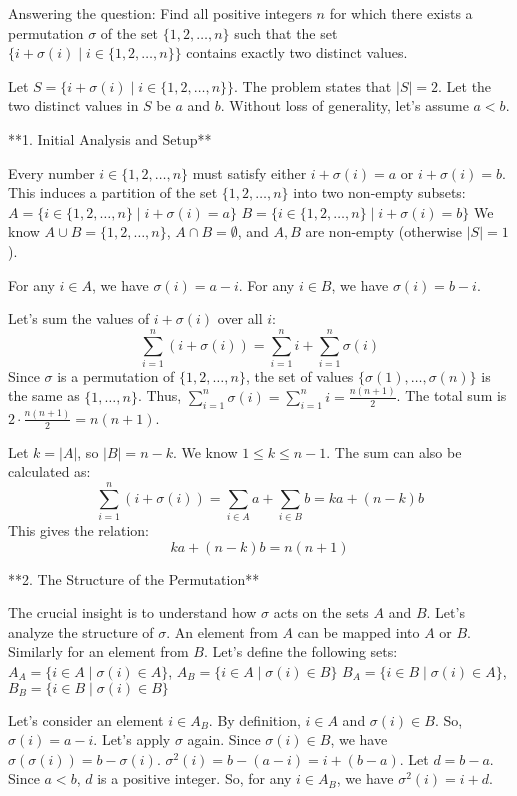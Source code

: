 Answering the question: Find all positive integers $n$ for which there exists a permutation $\sigma$ of the set $\{1, 2, \dots, n\}$ such that the set $\{i + \sigma(i) \mid i \in \{1, 2, \dots, n\}\}$ contains exactly two distinct values.

Let $S = \{i + \sigma(i) \mid i \in \{1, 2, \dots, n\}\}$. The problem states that $|S|=2$.
Let the two distinct values in $S$ be $a$ and $b$. Without loss of generality, let's assume $a < b$.

**1. Initial Analysis and Setup**

Every number $i \in \{1, 2, \dots, n\}$ must satisfy either $i + \sigma(i) = a$ or $i + \sigma(i) = b$.
This induces a partition of the set $\{1, 2, \dots, n\}$ into two non-empty subsets:
$A = \{i \in \{1, 2, \dots, n\} \mid i + \sigma(i) = a\}$
$B = \{i \in \{1, 2, \dots, n\} \mid i + \sigma(i) = b\}$
We know $A \cup B = \{1, 2, \dots, n\}$, $A \cap B = \emptyset$, and $A, B$ are non-empty (otherwise $|S|=1$).

For any $i \in A$, we have $\sigma(i) = a-i$.
For any $i \in B$, we have $\sigma(i) = b-i$.

Let's sum the values of $i + \sigma(i)$ over all $i$:
$$ \sum_{i=1}^n (i + \sigma(i)) = \sum_{i=1}^n i + \sum_{i=1}^n \sigma(i) $$
Since $\sigma$ is a permutation of $\{1, 2, \dots, n\}$, the set of values $\{\sigma(1), \dots, \sigma(n)\}$ is the same as $\{1, \dots, n\}$. Thus, $\sum_{i=1}^n \sigma(i) = \sum_{i=1}^n i = \frac{n(n+1)}{2}$.
The total sum is $2 \cdot \frac{n(n+1)}{2} = n(n+1)$.

Let $k = |A|$, so $|B|=n-k$. We know $1 \le k \le n-1$.
The sum can also be calculated as:
$$ \sum_{i=1}^n (i + \sigma(i)) = \sum_{i \in A} a + \sum_{i \in B} b = ka + (n-k)b $$
This gives the relation:
$$ ka + (n-k)b = n(n+1) $$

**2. The Structure of the Permutation**

The crucial insight is to understand how $\sigma$ acts on the sets $A$ and $B$.
Let's analyze the structure of $\sigma$. An element from $A$ can be mapped into $A$ or $B$. Similarly for an element from $B$. Let's define the following sets:
$A_A = \{i \in A \mid \sigma(i) \in A\}$, $A_B = \{i \in A \mid \sigma(i) \in B\}$
$B_A = \{i \in B \mid \sigma(i) \in A\}$, $B_B = \{i \in B \mid \sigma(i) \in B\}$

Let's consider an element $i \in A_B$. By definition, $i \in A$ and $\sigma(i) \in B$.
So, $\sigma(i) = a-i$.
Let's apply $\sigma$ again. Since $\sigma(i) \in B$, we have $\sigma(\sigma(i)) = b - \sigma(i)$.
$\sigma^2(i) = b - (a-i) = i + (b-a)$.
Let $d = b-a$. Since $a<b$, $d$ is a positive integer.
So, for any $i \in A_B$, we have $\sigma^2(i) = i+d$.

